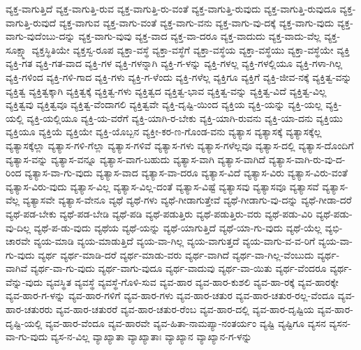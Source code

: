 {ವ್ಯಕ್ತ-ವಾಗುತ್ತಿದೆ
ವ್ಯಕ್ತ-ವಾಗುತ್ತಿ-ರುವ
ವ್ಯಕ್ತ-ವಾಗುತ್ತಿ-ರು-ವಂತೆ
ವ್ಯಕ್ತ-ವಾಗುತ್ತಿ-ರುವುದು
ವ್ಯಕ್ತ-ವಾಗುತ್ತಿ-ರುವುದೂ
ವ್ಯಕ್ತ-ವಾಗುತ್ತಿ-ರುವುದೆ
ವ್ಯಕ್ತ-ವಾಗುವ
ವ್ಯಕ್ತ-ವಾಗು-ವಂತೆ
ವ್ಯಕ್ತ-ವಾಗು-ವನು
ವ್ಯಕ್ತ-ವಾಗು-ವು-ದಕ್ಕೆ
ವ್ಯಕ್ತ-ವಾಗು-ವುದು
ವ್ಯಕ್ತ-ವಾಗು-ವುದೆಂಬು-ದನ್ನು
ವ್ಯಕ್ತ-ವಾಗು-ವುವು
ವ್ಯಕ್ತ-ವಾದ
ವ್ಯಕ್ತ-ವಾ-ದರೂ
ವ್ಯಕ್ತ-ವಾದುದು
ವ್ಯಕ್ತ-ವಾದು-ವೆಲ್ಲ
ವ್ಯಕ್ತ-ಸೂಕ್ಷ್ಮಾ
ವ್ಯಕ್ತಸ್ಥಿತಿಯೇ
ವ್ಯಕ್ತಸ್ವ-ರೂಪ
ವ್ಯಕ್ತಾ-ವಸ್ಥೆ
ವ್ಯಕ್ತಾ-ವಸ್ಥೆಗೆ
ವ್ಯಕ್ತಾ-ವಸ್ಥೆಯ
ವ್ಯಕ್ತಾ-ವಸ್ಥೆಯು
ವ್ಯಕ್ತಾ-ವಸ್ಥೆಯೇ
ವ್ಯಕ್ತಿ
ವ್ಯಕ್ತಿ-ಗತ
ವ್ಯಕ್ತಿ-ಗತ-ವಾದ
ವ್ಯಕ್ತಿ-ಗಳ
ವ್ಯಕ್ತಿ-ಗಳನ್ನಾಗಿ
ವ್ಯಕ್ತಿ-ಗ-ಳನ್ನು
ವ್ಯಕ್ತಿ-ಗಳಲ್ಲ
ವ್ಯಕ್ತಿ-ಗಳಲ್ಲಿಯೂ
ವ್ಯಕ್ತಿ-ಗಳಾ-ಗಿಲ್ಲ
ವ್ಯಕ್ತಿ-ಗಳಿಂದ
ವ್ಯಕ್ತಿ-ಗಳಿ-ಗಾದ
ವ್ಯಕ್ತಿ-ಗಳು
ವ್ಯಕ್ತಿ-ಗ-ಳೆಂದು
ವ್ಯಕ್ತಿ-ಗಳೆಲ್ಲ
ವ್ಯಕ್ತಿಗೂ
ವ್ಯಕ್ತಿಗೆ
ವ್ಯಕ್ತಿ-ಜೀವ-ನಕ್ಕೆ
ವ್ಯಕ್ತಿತ್ವ-ವನ್ನು
ವ್ಯಕ್ತಿತ್ವ
ವ್ಯಕ್ತಿತ್ವಕ್ಕಾಗಿ
ವ್ಯಕ್ತಿತ್ವಕ್ಕೆ
ವ್ಯಕ್ತಿತ್ವ-ಗಳು
ವ್ಯಕ್ತಿತ್ವದ
ವ್ಯಕ್ತಿತ್ವ-ಭಾವ
ವ್ಯಕ್ತಿತ್ವ-ವನ್ನು
ವ್ಯಕ್ತಿತ್ವ-ವಿದೆ
ವ್ಯಕ್ತಿತ್ವ-ವಿಲ್ಲ
ವ್ಯಕ್ತಿತ್ವವು
ವ್ಯಕ್ತಿತ್ವವೂ
ವ್ಯಕ್ತಿತ್ವ-ವೆಂದಾಗಲಿ
ವ್ಯಕ್ತಿತ್ವವೇ
ವ್ಯಕ್ತಿ-ದೃಷ್ಟಿ-ಯಿಂದ
ವ್ಯಕ್ತಿಯ
ವ್ಯಕ್ತಿ-ಯನ್ನು
ವ್ಯಕ್ತಿ-ಯಲ್ಲ
ವ್ಯಕ್ತಿ-ಯಲ್ಲಿ
ವ್ಯಕ್ತಿ-ಯಲ್ಲಿಯೂ
ವ್ಯಕ್ತಿ-ಯ-ವರೆಗೆ
ವ್ಯಕ್ತಿ-ಯಾಗಿ-ರ-ಬೇಕು
ವ್ಯಕ್ತಿ-ಯಾಗಿ-ರುವನು
ವ್ಯಕ್ತಿ-ಯಾ-ದನು
ವ್ಯಕ್ತಿಯು
ವ್ಯಕ್ತಿಯೂ
ವ್ಯಕ್ತಿಯೆ
ವ್ಯಕ್ತಿಯೇ
ವ್ಯಕ್ತಿ-ಯೊಬ್ಬನ
ವ್ಯಕ್ತೀ-ಕರ-ಣ-ಗೊಂಡ-ವನು
ವ್ಯತ್ಯಾಸ
ವ್ಯತ್ಯಾಸಕ್ಕೆ
ವ್ಯತ್ಯಾಸಕ್ಕೆಲ್ಲ
ವ್ಯತ್ಯಾಸಕ್ಕೆಲ್ಲಾ
ವ್ಯತ್ಯಾಸ-ಗಳಿ-ಗೆಲ್ಲಾ
ವ್ಯತ್ಯಾಸ-ಗಳಿವೆ
ವ್ಯತ್ಯಾಸ-ಗಳು
ವ್ಯತ್ಯಾಸ-ಗಳೆಲ್ಲವೂ
ವ್ಯತ್ಯಾಸ-ದಲ್ಲಿ
ವ್ಯತ್ಯಾಸ-ದೊಂದಿಗೆ
ವ್ಯತ್ಯಾಸ-ವನ್ನು
ವ್ಯತ್ಯಾಸ-ವನ್ನೂ
ವ್ಯತ್ಯಾಸ-ವಾಗ-ಬಹುದು
ವ್ಯತ್ಯಾಸ-ವಾಗಿ
ವ್ಯತ್ಯಾಸ-ವಾಗಿದೆ
ವ್ಯತ್ಯಾಸ-ವಾಗಿ-ರು-ವು-ದ-ರಿಂದ
ವ್ಯತ್ಯಾಸ-ವಾ-ಗು-ವುದು
ವ್ಯತ್ಯಾಸ-ವಾದ
ವ್ಯತ್ಯಾಸ-ವಾ-ದರೂ
ವ್ಯತ್ಯಾಸ-ವಿದೆ
ವ್ಯತ್ಯಾಸ-ವಿರು
ವ್ಯತ್ಯಾಸ-ವಿರು-ವಂತೆ
ವ್ಯತ್ಯಾಸ-ವಿರು-ವುದು
ವ್ಯತ್ಯಾಸ-ವಿಲ್ಲ
ವ್ಯತ್ಯಾಸ-ವಿಲ್ಲ-ದಂತೆ
ವ್ಯತ್ಯಾಸ-ವಿಷ್ಟೆ
ವ್ಯತ್ಯಾಸವು
ವ್ಯತ್ಯಾಸವೂ
ವ್ಯತ್ಯಾಸವೆ
ವ್ಯತ್ಯಾಸ-ವೆಲ್ಲ
ವ್ಯತ್ಯಾಸವೇ
ವ್ಯತ್ಯಾಸ-ವೇನೂ
ವ್ಯಥೆ
ವ್ಯಥೆ-ಗಳು
ವ್ಯಥೆ-ಗೀಡಾಗುತ್ತೇವೆ
ವ್ಯಥೆ-ಗೀಡಾಗು-ವು-ದನ್ನು
ವ್ಯಥೆ-ಗೀಡಾ-ದರೆ
ವ್ಯಥೆ-ಪಡ-ಬೇಕು
ವ್ಯಥೆ-ಪಡ-ಬೇಡಿ
ವ್ಯಥೆ-ಪಡಿ
ವ್ಯಥೆ-ಪಡುತ್ತಿರು
ವ್ಯಥೆ-ಪಡುತ್ತಿರು-ವರು
ವ್ಯಥೆ-ಪಡು-ವಿರಿ
ವ್ಯಥೆ-ಪಡು-ವು-ದಿಲ್ಲ
ವ್ಯಥೆ-ಪ-ಡು-ವುದು
ವ್ಯಥೆಯ
ವ್ಯಥೆ-ಯನ್ನು
ವ್ಯಥೆ-ಯಾಗುತ್ತಿದೆ
ವ್ಯಥೆ-ಯಾ-ಗು-ವುದು
ವ್ಯಥೆ-ಯೆಲ್ಲ
ವ್ಯಭಿ-ಚಾರವೇ
ವ್ಯಯ-ಮಾಡಿ
ವ್ಯಯ-ಮಾಡುತ್ತಿದೆ
ವ್ಯಯ-ವಾ-ಗಿಲ್ಲ
ವ್ಯಯ-ವಾಗುತ್ತದೆ
ವ್ಯಯ-ವಾಗು-ವ-ವ-ರಿಗೆ
ವ್ಯಯ-ವಾ-ಗು-ವುದು
ವ್ಯರ್ಥ
ವ್ಯರ್ಥ-ಮಾಡಿ-ದರೆ
ವ್ಯರ್ಥ-ಮಾಡು-ವರು
ವ್ಯರ್ಥ-ವಾಗಿದೆ
ವ್ಯರ್ಥ-ವಾ-ಗಿಲ್ಲ-ವೆಂಬುದು
ವ್ಯರ್ಥ-ವಾಗಿವೆ
ವ್ಯರ್ಥ-ವಾ-ಗು-ವುದು
ವ್ಯರ್ಥ-ವಾಗು-ವುದೂ
ವ್ಯರ್ಥ-ವಾದುವು
ವ್ಯರ್ಥ-ವಾ-ಯಿತು
ವ್ಯರ್ಥ-ವೆಂದರೂ
ವ್ಯರ್ಥ-ವೆನ್ನು-ವುದು
ವ್ಯವಸ್ಥಿತ
ವ್ಯವಸ್ಥೆ
ವ್ಯವಸ್ಥೆ-ಗೊಳಿ-ಸುವ
ವ್ಯವ-ಹಾರ
ವ್ಯವ-ಹಾರ-ಕುಶಲಿ
ವ್ಯವ-ಹಾ-ರಕ್ಕೆ
ವ್ಯವ-ಹಾರಕ್ಕೇ
ವ್ಯವ-ಹಾರ-ಗ-ಳನ್ನು
ವ್ಯವ-ಹಾರ-ಗಳಿಗೆ
ವ್ಯವ-ಹಾರ-ಗಳು
ವ್ಯವ-ಹಾರ-ಚತುರ
ವ್ಯವ-ಹಾರ-ಚತುರ-ರಲ್ಲ-ವೆಂದೂ
ವ್ಯವ-ಹಾರ-ಚತುರರು
ವ್ಯವ-ಹಾರ-ಚತುರರೆ
ವ್ಯವ-ಹಾರ-ಚತುರ-ರೆಂಬ
ವ್ಯವ-ಹಾರ-ದಲ್ಲಿ
ವ್ಯವ-ಹಾರ-ದೃಷ್ಟಿಯ
ವ್ಯವ-ಹಾರ-ದೃಷ್ಟಿ-ಯಲ್ಲಿ
ವ್ಯವ-ಹಾರ-ವೆಂದೂ
ವ್ಯವ-ಹಾರವೇ
ವ್ಯವ-ಹಿತಾ-ನಾಮಪ್ಯಾ-ನಂತರ್ಯಂ
ವ್ಯಷ್ಟಿ
ವ್ಯಷ್ಟಿಗೂ
ವ್ಯಸನ
ವ್ಯಸನ-ವಾ-ಗು-ವುದು
ವ್ಯಸ-ನ-ವಿಲ್ಲ
ವ್ಯಾಖ್ಯಾತಾ
ವ್ಯಾಖ್ಯಾತಾಃ
ವ್ಯಾಖ್ಯಾನ
ವ್ಯಾಖ್ಯಾನ-ಗ-ಳನ್ನು
}
